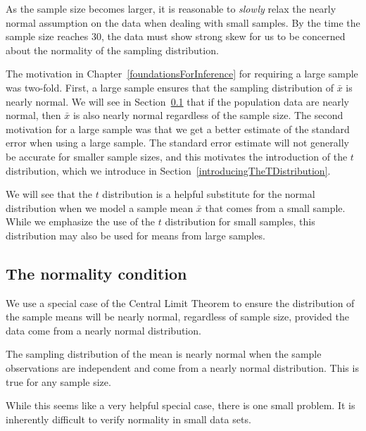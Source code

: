 \begin{tipBox}{
As the sample size becomes larger, it is reasonable to \emph{slowly} relax the nearly normal assumption on the data when dealing with small samples. By the time the sample size reaches 30, the data must show strong skew for us to be concerned about the normality of the sampling distribution.}
\end{tipBox}

The motivation in Chapter~\ref{foundationsForInference} for requiring a large sample was two-fold. First, a large sample ensures that the sampling distribution of $\bar{x}$ is nearly normal. We will see in Section~\ref{normalityCond} that if the population data are nearly normal, then $\bar{x}$ is also nearly normal regardless of the sample size. The second motivation for a large sample was that we get a better estimate of the standard error when using a large sample. The standard error estimate will not generally be accurate for smaller sample sizes, and this motivates the introduction of the $t$ distribution, which we introduce in Section~\ref{introducingTheTDistribution}.

We will see that the $t$ distribution is a helpful substitute for the normal distribution when we model a sample mean $\bar{x}$ that comes from a small sample. While we emphasize the use of the $t$ distribution for small samples, this distribution may also be used for means from large samples.

\subsection{The normality condition}
\label{normalityCond}

We use a special case of the Central Limit Theorem to ensure the distribution of the sample means will be nearly normal, regardless of sample size, provided the data come from a nearly normal distribution.

\begin{termBox}{
The sampling distribution of the mean is nearly normal when the sample observations are independent and come from a nearly normal distribution. This is true for any sample size.
}
\end{termBox}

While this seems like a very helpful special case, there is one small problem. It is inherently difficult to verify normality in small data sets.

